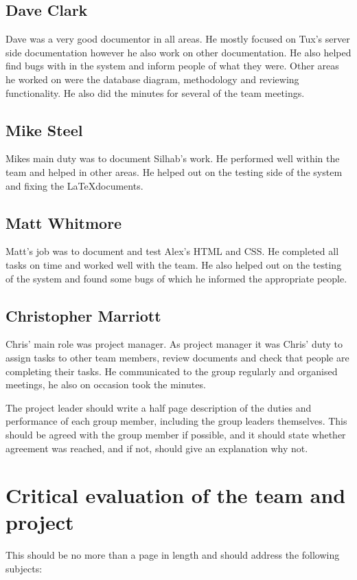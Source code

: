 \documentclass{project}
\begin{document}
\subsection{Dave Clark}
Dave was a very good documentor in all areas. He mostly focused on Tux's server side documentation however he also work on other documentation. He also helped find bugs with in the system and inform people of what they were. Other areas he worked on were the database diagram, methodology and reviewing functionality. He also did the minutes for several of the team meetings.

\subsection{Mike Steel}
Mikes main duty was to document Silhab's work. He performed well within the team and helped in other areas. He helped out on the testing side of the system and fixing the \LaTeX  documents. 

\subsection{Matt Whitmore}
Matt's job was to document and test Alex's HTML and CSS. He completed all tasks on time and worked well with the team. He also helped out on the testing of the system and found some bugs of which he informed the appropriate people.

\subsection{Christopher Marriott}
Chris' main role was project manager. As project manager it was Chris' duty to assign tasks to other team members, review documents and check that people are completing their tasks. He communicated to the group regularly and organised meetings, he also on occasion took the minutes.  

The project leader should write a half page description of the duties and
performance of each group member, including the group leaders themselves. This should be agreed with the
group member if possible, and it should state whether agreement was reached, and if not, should give an
explanation why not.


\section{Critical evaluation of the team and project}
This should be no more than a page in length and should address
the following subjects:
\end{document}
